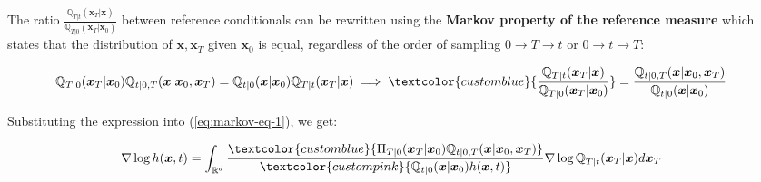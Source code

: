 \documentclass{article}
\newcommand{\bluetext}[1]{\textcolor{customblue}{#1}}
\newcommand{\pinktext}[1]{\textcolor{custompink}{#1}}
\begin{document}
The ratio $\frac{\mathbb{Q}_{T|t}(\boldsymbol{x}_T|\boldsymbol{x})}{\mathbb{Q}_{T|0}(\boldsymbol{x}_T|\boldsymbol{x}_0)}$ between reference conditionals can be rewritten using the \textbf{Markov property of the reference measure} which states that the distribution of $\boldsymbol{x}, \boldsymbol{x}_T$ given $\boldsymbol{x}_0$ is equal, regardless of the order of sampling $0\to T\to t$ or $0\to t\to T$:
\begin{small}
\begin{align}
    \mathbb{Q}_{T|0}(\boldsymbol{x}_T|\boldsymbol{x}_0)\mathbb{Q}_{t|0,T}(\boldsymbol{x}|\boldsymbol{x}_0,\boldsymbol{x}_T)&=\mathbb{Q}_{t|0}(\boldsymbol{x}|\boldsymbol{x}_0)\mathbb{Q}_{T|t}(\boldsymbol{x}_T|\boldsymbol{x})\implies \bluetext{\frac{\mathbb{Q}_{T|t}(\boldsymbol{x}_T|\boldsymbol{x})}{\mathbb{Q}_{T|0}(\boldsymbol{x}_T|\boldsymbol{x}_0)}}=\frac{\mathbb{Q}_{t|0,T}(\boldsymbol{x}|\boldsymbol{x}_0,\boldsymbol{x}_T)}{\mathbb{Q}_{t|0}(\boldsymbol{x}|\boldsymbol{x}_0)}
\end{align}
\end{small}
Substituting the expression into (\ref{eq:markov-eq-1}), we get:
\begin{small}
\begin{align}
    \nabla \log h(\boldsymbol{x},t)&=\int_{\mathbb{R}^d}\frac{\bluetext{\Pi_{T|0}(\boldsymbol{x}_T|\boldsymbol{x}_0)\mathbb{Q}_{t|0,T}(\boldsymbol{x}|\boldsymbol{x}_0,\boldsymbol{x}_T)}}{\pinktext{\mathbb{Q}_{t|0}(\boldsymbol{x}|\boldsymbol{x}_0)h(\boldsymbol{x},t)}}\nabla\log \mathbb{Q}_{T|t}(\boldsymbol{x}_T|\boldsymbol{x})d\boldsymbol{x}_T\label{eq:markov-eq-3}
\end{align}
\end{small}
\end{document}
